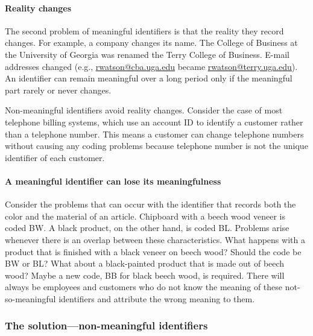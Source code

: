 \documentclass[
]{article}
\begin{document}
\hypertarget{reality-changes}{%
\paragraph*{Reality changes}\label{reality-changes}}

The second problem of meaningful identifiers is that the reality they
record changes. For example, a company changes its name. The College of
Business at the University of Georgia was renamed the Terry College of
Business. E-mail addresses changed (e.g.,
\href{mailto:rwatson@cba.uga.edu}{\underline{rwatson@cba.uga.edu}} became
\href{mailto:rwatson@terry.uga.edu}{\underline{rwatson@terry.uga.edu}}). An
identifier can remain meaningful over a long period only if the
meaningful part rarely or never changes.

Non-meaningful identifiers avoid reality changes. Consider the case of
most telephone billing systems, which use an account ID to identify a
customer rather than a telephone number. This means a customer can
change telephone numbers without causing any coding problems because
telephone number is not the unique identifier of each customer.

\hypertarget{a-meaningful-identifier-can-lose-its-meaningfulness}{%
\paragraph*{A meaningful identifier can lose its meaningfulness}\label{a-meaningful-identifier-can-lose-its-meaningfulness}}

Consider the problems that can occur with the identifier that records
both the color and the material of an article. Chipboard with a beech
wood veneer is coded BW. A black product, on the other hand, is coded
BL. Problems arise whenever there is an overlap between these
characteristics. What happens with a product that is finished with a
black veneer on beech wood? Should the code be BW or BL? What about a
black-painted product that is made out of beech wood? Maybe a new code,
BB for black beech wood, is required. There will always be employees and
customers who do not know the meaning of these not-so-meaningful
identifiers and attribute the wrong meaning to them.

\hypertarget{the-solutionnon-meaningful-identifiers}{%
\subsubsection*{The solution---non-meaningful identifiers}\label{the-solutionnon-meaningful-identifiers}}
\end{document}
